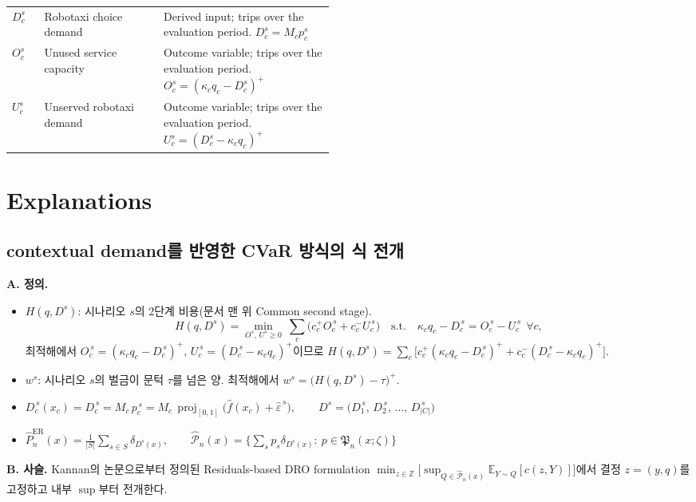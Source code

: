 \documentclass[10pt,a4paper]{article}
\begin{document}
{\begin{tabularx}{\linewidth}{@{}>{\raggedright\arraybackslash}p{0.1\linewidth}>{\raggedright\arraybackslash}p{0.37\linewidth}Y@{}}
$D_c^s$ & Robotaxi choice demand & Derived input; trips over the evaluation period. $D_c^s=M_cp_c^s$ \\
$O_c^s$ & Unused service capacity & Outcome variable; trips over the evaluation period. $O_c^s=(\kappa_cq_c-D_c^s)^+$ \\
$U_c^s$ & Unserved robotaxi demand & Outcome variable; trips over the evaluation period. $U_c^s=(D_c^s-\kappa_cq_c)^+$ \\
\bottomrule
\end{tabularx}
}

\section{Explanations}

\subsection{contextual demand를 반영한 CVaR 방식의 식 전개}

\textbf{A. 정의.}
\begin{itemize}[leftmargin=1.5em]
\item $H(q,D^s)$: 시나리오 $s$의 2단계 비용(문서 맨 위 Common second stage).
\[
H(q,D^s)=\min_{O^s,\,U^s\ge0}\ \sum_{c}\big(c_c^{+}O_c^{\,s}+c_c^{-}U_c^{\,s}\big)
\quad\text{s.t.}\quad \kappa_cq_c-D_c^{\,s}=O_c^{\,s}-U_c^{\,s}\ \ \forall c,
\]
최적해에서 $O_c^{\,s}=(\kappa_cq_c-D_c^{\,s})^+$, $U_c^{\,s}=(D_c^{\,s}-\kappa_cq_c)^+$이므로
$H(q,D^s)=\sum_c\big[c_c^{+}(\kappa_cq_c-D_c^{\,s})^+ + c_c^{-}(D_c^{\,s}-\kappa_cq_c)^+\big]$.
\item $w^{s}$: 시나리오 $s$의 벌금이 문턱 $\tau$를 넘은 양. 최적해에서 $w^{s}=\big(H(q,D^s)-\tau\big)^+$.

\item $D_c^{\,s}(x_c) = D_c^{\,s}=M_c\,p_c^{\,s} = M_c\,\operatorname{proj}_{[0,1]}\big(\hat f(x_c)+\hat\varepsilon^{\,s}\big), \qquad D^s=\big(D_1^{\,s},\,D_2^{\,s},\,\dots,\,D_{|C|}^{\,s}\big)$
\item $\hat P^{\mathrm{ER}}_n(x)=\frac{1}{|S|}\sum_{s\in S}\delta_{D^s(x)},\qquad
\hat{\mathcal P}_n(x)=\Big\{\textstyle\sum_s p_s\delta_{D^s(x)}:\ p\in\mathfrak P_n(x;\zeta)\Big\}$

\end{itemize}


\textbf{B. 사슬.} Kannan의 논문으로부터 정의된 Residuals-based DRO formulation $\min_{z\in\mathbb Z}\Big[\sup_{Q\in\hat{\mathcal P}_n(x)}\mathbb E_{Y\sim Q}[c(z,Y)]\Big]$에서 결정 $z=(y,q)$를 고정하고 내부 $\sup$부터 전개한다. 
\end{document}
